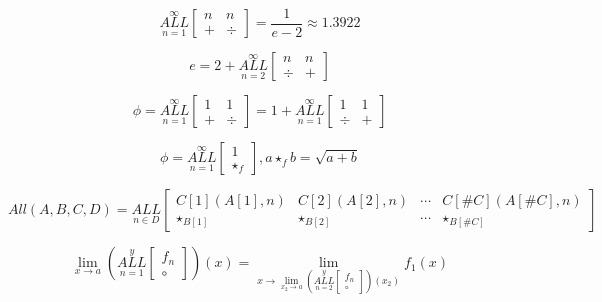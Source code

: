\documentclass{article}
\begin{document}
$$\underset{n=1}{\overset{\infty}{ALL}} \begin{bmatrix}
n & n \\
+ & \div
\end{bmatrix} = \frac{1}{e-2} \approx 1.3922$$

$$e=2+\underset{n=2}{\overset{\infty}{ALL}} \begin{bmatrix}
n & n \\
\div & +
\end{bmatrix}$$

$$\phi=\underset{n=1}{\overset{\infty}{ALL}} \begin{bmatrix}
1 & 1 \\
+ & \div
\end{bmatrix}=1+\underset{n=1}{\overset{\infty}{ALL}} \begin{bmatrix}
1 & 1 \\
\div & +
\end{bmatrix}$$

$$\phi=\underset{n=1}{\overset{\infty}{ALL}} \begin{bmatrix}
1 \\
\star_f
\end{bmatrix}, a \star_f b = \sqrt{a+b}$$

$$All(A, B, C, D)=\underset{n \in D}{ALL} \begin{bmatrix}
C[1](A[1],n) & C[2](A[2],n) & \cdots & C[\#C](A[\#C],n) \\
\star_{B[1]}& \star_{B[2]} & \cdots & \star_{B[\#C]}
\end{bmatrix}$$

$$\underset{x \rightarrow a}{\lim} (\underset{n=1}{\overset{y}{ALL}} \begin{bmatrix}
f_n \\
\circ
\end{bmatrix})(x) = \underset{x \rightarrow \underset{x_2 \rightarrow a}{\lim} (\underset{n=2}{\overset{y}{ALL}} \begin{bmatrix}
f_n \\
\circ
\end{bmatrix})(x_2)}{\lim} f_1(x)$$
\end{document}
